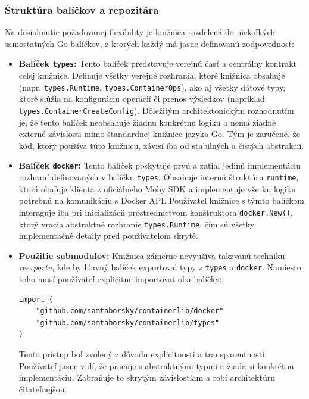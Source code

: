 \documentclass[
 program=infpvs,
  language=slovak,
  figures=false,
  tables=false,
  sourcecodes,
  glossaries,
  index
]{kidiplom}
\begin{document}
{\subsubsection{Štruktúra balíčkov a repozitára}  \label{sec:struktura}
Na dosiahnutie požadovanej flexibility je knižnica rozdelená do niekoľkých samostatných Go balíčkov, z ktorých každý má jasne definovanú zodpovednosť:

\begin{itemize}
\item \textbf{Balíček \texttt{types}:} Tento balíček predstavuje verejnú časť a centrálny kontrakt celej knižnice. Definuje všetky verejné rozhrania, ktoré knižnica obsahuje (napr. \texttt{types.Runtime}, \texttt{types.ContainerOps}), ako aj všetky dátové typy, ktoré slúžia na konfiguráciu operácií či prenos výsledkov (napríklad \texttt{types.ContainerCreateConfig}). Dôležitým architektonickým rozhodnutím je, že tento balíček neobsahuje žiadnu konkrétnu logiku a nemá žiadne externé závislosti mimo štandardnej knižnice jazyka Go. Tým je zaručené, že kód, ktorý používa túto knižnicu, závisí iba od stabilných a čistých abstrakcií.

\item \textbf{Balíček \texttt{docker}:} Tento balíček poskytuje prvú a zatiaľ jedinú implementáciu rozhraní definovaných v balíčku \texttt{types}. Obsahuje internú štruktúru \texttt{runtime}, ktorá obaľuje klienta z oficiálneho Moby SDK a implementuje všetku logiku potrebnú na komunikáciu s Docker API. Používateľ knižnice s týmto balíčkom interaguje iba pri inicializácii prostredníctvom konštruktora \texttt{docker.New()}, ktorý vracia abstraktné rozhranie \texttt{types.Runtime}, čím sú všetky implementačné detaily pred používateľom skryté.

\item \textbf{Použitie submodulov:} Knižnica zámerne nevyužíva takzvanú techniku \textit{reexportu}, kde by hlavný balíček exportoval typy z \texttt{types} a \texttt{docker}. Namiesto toho musí používateľ explicitne importovať oba balíčky:

\begin{lstlisting}
import (
    "github.com/samtaborsky/containerlib/docker"
    "github.com/samtaborsky/containerlib/types"
)
\end{lstlisting}
    
Tento prístup bol zvolený z dôvodu explicitnosti a transparentnosti. Používateľ jasne vidí, že pracuje s abstraktnými typmi a žiada si konkrétnu implementáciu. Zabraňuje to skrytým závislostiam a robí architektúru čitateľnejšou.
\end{itemize}



}
\end{document}

